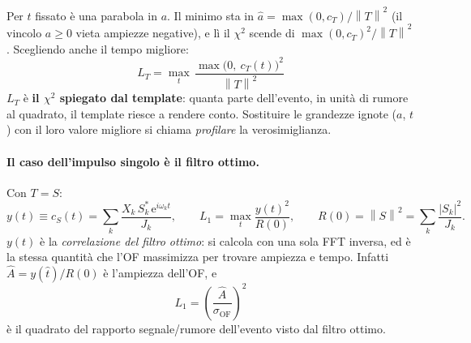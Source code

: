 \documentclass[11pt,a4paper]{article}
\newcommand{\norm}[1]{\left\lVert #1 \right\rVert}
\newcommand{\e}{\mathrm{e}}
\begin{document}
Per $t$ fissato è una parabola in $a$. Il minimo sta in $\hat a = \max(0, c_T)/\norm{T}^2$ (il
vincolo $a\geq0$ vieta ampiezze negative), e lì il $\chi^2$ scende di
$\max(0,c_T)^2/\norm{T}^2$. Scegliendo anche il tempo migliore:
\begin{equation}
  \boxed{\;L_T = \max_t\, \frac{\max\!\big(0,\ c_T(t)\big)^2}{\norm{T}^2}\;}
  \label{eq:LT}
\end{equation}
$L_T$ è \textbf{il $\chi^2$ spiegato dal template}: quanta parte dell'evento, in unità di rumore al
quadrato, il template riesce a rendere conto. Sostituire le grandezze ignote ($a$, $t$) con il loro
valore migliore si chiama \emph{profilare} la verosimiglianza.

\paragraph{Il caso dell'impulso singolo è il filtro ottimo.} Con $T = S$:
\begin{equation}
  y(t) \equiv c_S(t) = \sum_k \frac{X_k\, S_k^{*}\, \e^{i\omega_k t}}{J_k},
  \qquad
  L_1 = \max_t \frac{y(t)^2}{R(0)},
  \qquad R(0) = \norm{S}^2 = \sum_k \frac{|S_k|^2}{J_k}.
  \label{eq:y}
\end{equation}
$y(t)$ è la \emph{correlazione del filtro ottimo}: si calcola con una sola FFT inversa, ed è la
stessa quantità che l'OF massimizza per trovare ampiezza e tempo. Infatti
$\hat A = y(\hat t)/R(0)$ è l'ampiezza dell'OF, e
\begin{equation}
  L_1 = \left(\frac{\hat A}{\sigma_\mathrm{OF}}\right)^2
\end{equation}
è il quadrato del rapporto segnale/rumore dell'evento visto dal filtro ottimo.
\end{document}
